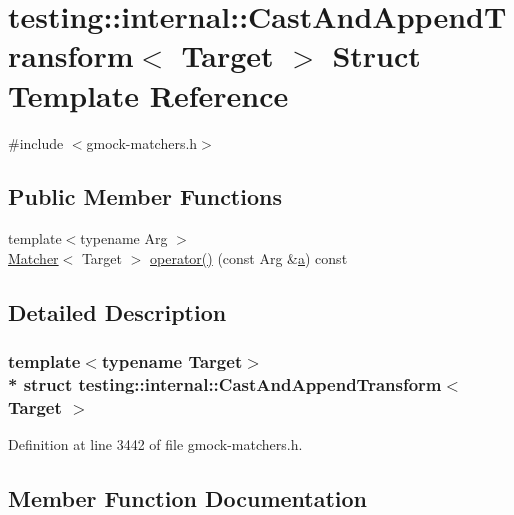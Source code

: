 \hypertarget{structtesting_1_1internal_1_1_cast_and_append_transform}{}\section{testing\+:\+:internal\+:\+:Cast\+And\+Append\+Transform$<$ Target $>$ Struct Template Reference}
\label{structtesting_1_1internal_1_1_cast_and_append_transform}


{\ttfamily \#include $<$gmock-\/matchers.\+h$>$}

\subsection*{Public Member Functions}
\begin{DoxyCompactItemize}
\item 
{\footnotesize template$<$typename Arg $>$ }\\\hyperlink{classtesting_1_1_matcher}{Matcher}$<$ Target $>$ \hyperlink{structtesting_1_1internal_1_1_cast_and_append_transform_a09f165d9b2c0c6ac199a2ba9674b0c12}{operator()} (const Arg \&\hyperlink{_07copy_08_2_read_camera_model_8m_a551a3d351eadcc0b9b1a2f24f0fb5ea0}{a}) const 
\end{DoxyCompactItemize}


\subsection{Detailed Description}
\subsubsection*{template$<$typename Target$>$\\*
struct testing\+::internal\+::\+Cast\+And\+Append\+Transform$<$ Target $>$}



Definition at line 3442 of file gmock-\/matchers.\+h.



\subsection{Member Function Documentation}
